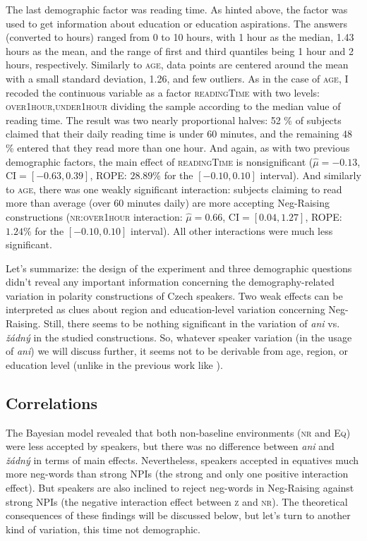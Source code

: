 The last demographic factor was reading time. As hinted above, the factor was used to get information about education or education aspirations. The answers (converted to hours) ranged from 0 to 10 hours, with 1 hour as the median, 1.43 hours as the mean, and the range of first and third quantiles being 1 hour and 2 hours, respectively. Similarly to \textsc{age}, data points are centered around the mean with a small standard deviation, 1.26, and few outliers. As in the case of \textsc{age}, I recoded the continuous variable as a factor \textsc{readingTime} with two levels: \textsc{over1hour,under1hour} dividing the sample according to the median value of reading time. The result was two nearly proportional halves: 52 \% of subjects claimed that their daily reading time is under 60 minutes, and the remaining 48 \% entered that they read more than one hour. And again, as with two previous demographic factors, the main effect of \textsc{readingTime} is nonsignificant ($\hat{\mu}=-0.13$, $\mathrm{CI}=[-0.63,  0.39]$, ROPE: $28.89\%$ for the $[-0.10, 0.10]$ interval). And similarly to \textsc{age}, there was one weakly significant interaction: subjects claiming to read more than average (over 60 minutes daily) are more accepting Neg-Raising constructions (\textsc{nr:over1hour} interaction: $\hat{\mu}=0.66$, $\mathrm{CI}=[ 0.04,  1.27]$, ROPE: $1.24\%$ for the $[-0.10, 0.10]$ interval). All other interactions were much less significant.

Let's summarize: the design of the experiment and three demographic questions didn't reveal any important information concerning the demography-related variation in polarity constructions of Czech speakers. Two weak effects can be interpreted as clues about region and education-level variation concerning Neg-Raising. Still, there seems to be nothing significant in the variation of \textit{ani} vs. \textit{žádný} in the studied constructions. So, whatever speaker variation (in the usage of \textit{ani}) we will discuss further, it seems not to be derivable from age, region, or education level (unlike in the previous work like \citealt{burnett2015variable,burnett2018structural}).


\subsection{Correlations}

The Bayesian model revealed that both non-baseline environments (\textsc{nr} and \textsc{Eq}) were less accepted by speakers, but there was no difference between \textit{ani} and \textit{žádný} in terms of main effects. Nevertheless, speakers accepted in equatives much more neg-words than strong NPIs (the strong and only one positive interaction effect). But speakers are also inclined to reject neg-words in Neg-Raising against strong NPIs (the negative interaction effect between \textsc{z} and \textsc{nr}). The theoretical consequences of these findings will be discussed below, but let's turn to another kind of variation, this time not demographic.


